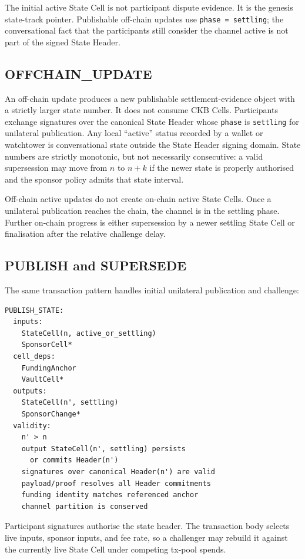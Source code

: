 \documentclass[a4paper,11pt]{article}
\begin{document}
The initial active State Cell is not participant dispute evidence. It is the
genesis state-track pointer. Publishable off-chain updates use
\texttt{phase = settling}; the conversational fact that the participants still
consider the channel active is not part of the signed State Header.

\subsection{OFFCHAIN\_UPDATE}

An off-chain update produces a new publishable settlement-evidence object with a strictly larger state number. It does not consume CKB Cells. Participants exchange signatures over the canonical State Header whose \texttt{phase} is \texttt{settling} for unilateral publication. Any local ``active'' status recorded by a wallet or watchtower is conversational state outside the State Header signing domain. State numbers are strictly monotonic, but not necessarily consecutive: a valid supersession may move from $n$ to $n+k$ if the newer state is properly authorised and the sponsor policy admits that state interval.

Off-chain active updates do not create on-chain active State Cells. Once a unilateral publication reaches the chain, the channel is in the settling phase. Further on-chain progress is either supersession by a newer settling State Cell or finalisation after the relative challenge delay.

\subsection{PUBLISH and SUPERSEDE}

The same transaction pattern handles initial unilateral publication and challenge:
\begin{lstlisting}
PUBLISH_STATE:
  inputs:
    StateCell(n, active_or_settling)
    SponsorCell*
  cell_deps:
    FundingAnchor
    VaultCell*
  outputs:
    StateCell(n', settling)
    SponsorChange*
  validity:
    n' > n
    output StateCell(n', settling) persists
      or commits Header(n')
    signatures over canonical Header(n') are valid
    payload/proof resolves all Header commitments
    funding identity matches referenced anchor
    channel partition is conserved
\end{lstlisting}

Participant signatures authorise the state header. The transaction body selects live inputs, sponsor inputs, and fee rate, so a challenger may rebuild it against the currently live State Cell under competing tx-pool spends.
\end{document}

